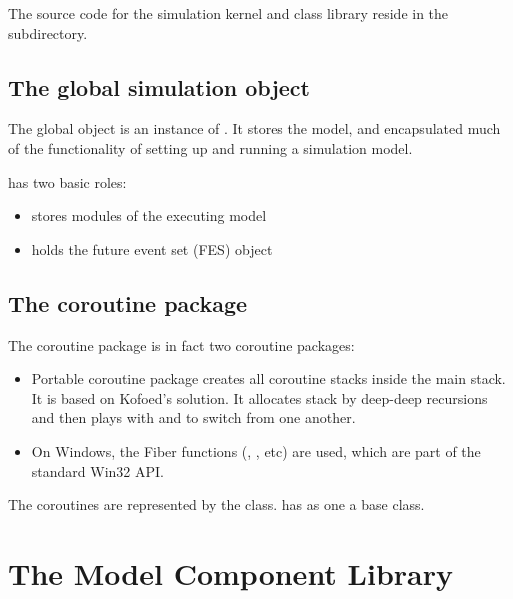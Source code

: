 The source code for the simulation kernel
and class library reside in the  subdirectory.


\subsection{The global simulation object}

The global  object is an instance of .
It stores the model, and encapsulated much of the functionality
of setting up and running a simulation model.

 has two basic roles:

\begin{itemize}
  \item{stores modules of the executing model}
  \item{holds the future event set (FES) object}
\end{itemize}



\subsection{The coroutine package}

The coroutine package is in fact two coroutine
packages:

\begin{itemize}
  \item Portable coroutine package creates all coroutine stacks
     inside the main stack. It is based on Kofoed's solution\cite{Kofoed95}.
     It allocates stack by deep-deep recursions and then plays with
      and  to switch from one another.

  \item On Windows, the Fiber functions (,
     , etc) are used, which are part of
     the standard Win32 API.
\end{itemize}

The coroutines are represented by the 
class.  has  as one a
base class.



\section{The Model Component Library}

